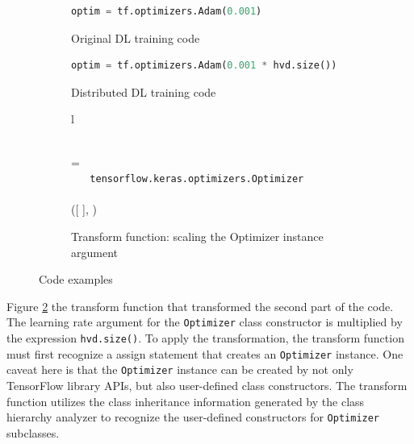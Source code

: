 \pagebreak
\begin{figure}[ht!]
    \centering

    \begin{subfigure}[t]{0.48\textwidth}
        \begin{lstlisting}[language=Python]
        optim = tf.optimizers.Adam(0.001)\end{lstlisting}
        \caption{Original DL training code}
    \end{subfigure}

    \hspace{5mm}

    \begin{subfigure}[t]{0.48\textwidth}
        \begin{lstlisting}[language=Python]
        optim = tf.optimizers.Adam(0.001 * hvd.size())\end{lstlisting}
        \caption{Distributed DL training code}
    \end{subfigure}

    \begin{subfigure}[t]{\textwidth}
        \centering
        \begin{tabular}{l}

            \\

             = \\

            \inden \ktif ~  \ktsubtysubs{\smodenv} ~ {\tt tensorflow.keras.optimizers.Optimizer}\\
            \inden \ktthen \\

            \inden\inden ([ \oassign {} ], )\\

        \end{tabular}
        \caption{Transform function: scaling the Optimizer instance argument}
        \label{fig:trans:fn02}
    \end{subfigure}
    \caption{Code examples}
    \label{fig:trans:ex02}
\end{figure}

Figure \ref{fig:trans:ex02} the transform function that transformed the second
part of the code.
The learning rate argument for the {\tt Optimizer} class constructor is 
multiplied by the expression {\tt hvd.size()}. 
To apply the transformation, the transform function must first recognize a
assign statement that creates an {\tt Optimizer} instance.
One caveat here is that the {\tt Optimizer} instance can be 
created by not only TensorFlow library APIs, but also
user-defined class constructors. 
The transform function utilizes the class inheritance information
generated by the class hierarchy analyzer to recognize the user-defined
constructors for {\tt Optimizer} subclasses.

